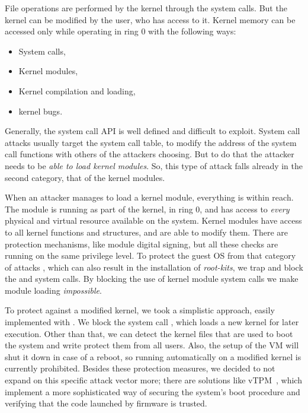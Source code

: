 \par File operations are performed by the kernel through the system calls. But the kernel can be modified by the  user, who has access to it. Kernel memory can be accessed only while operating in ring 0 with the following ways:

\begin{itemize}
	\item System calls,
	\item Kernel modules,
	\item Kernel compilation and loading,
	\item kernel bugs.
\end{itemize}

\par Generally, the system call \ac{API} is well defined and difficult to exploit. System call attacks usually target the system call table, to modify the address of the system call functions with others of the attackers choosing. But to do that the attacker needs to be \emph{able to load kernel modules}. So, this type of attack falls already in the second category, that of the kernel modules.

\par When an attacker manages to load a kernel module, everything is within reach. The module is running as part of the kernel, in ring 0, and has access to \emph{every} physical and virtual resource available on the system. Kernel modules have access to all kernel functions and structures, and are able to modify them. There are protection mechanisms, like module digital signing, but all these checks are running on the same privilege level. To protect the guest \ac{OS} from that category
of attacks
, which can also result in the installation of \emph{root-kits}, we trap and block the  and  system calls.
By blocking the use of kernel module system calls we make module loading \emph{impossible}.

\par To protect against a modified kernel, we took a simplistic approach, easily implemented with . We block the system call , which loads a new kernel for later execution. Other than that, we can detect the kernel files that are used to boot the system and write protect them from all users. Also, the setup of the \ac{VM} will shut it down in case of a reboot, so running automatically on a modified kernel is currently prohibited. Besides these protection measures, we decided to not expand on this specific attack vector more; there are solutions like vTPM~\cite{perez2006vtpm}, which implement a more sophisticated way of securing the system's boot procedure and verifying that the code launched by firmware is trusted. 


